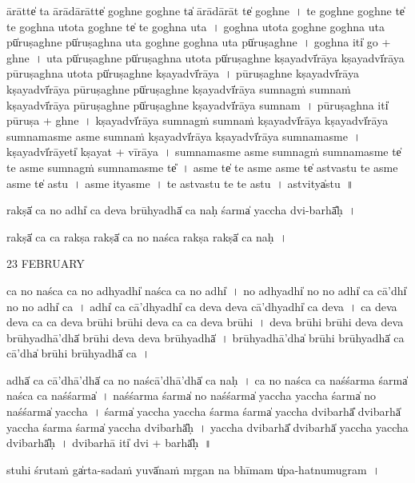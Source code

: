 \documentclass[parskip, DIV=14]{scrartcl}
\begin{document}
{ā॒rātte̍ ta ā॒rādā॒rātte̍ go॒ghne go॒ghne ta̍ ā॒rādā॒rāt te̍ go॒ghne~। %
te॒ go॒ghne go॒ghne te̍ te go॒ghna u॒tota go॒ghne te̍ te go॒ghna u॒ta~।
go॒ghna u॒tota go॒ghne go॒ghna u॒ta pū̍ruṣa॒ghne pū̍ruṣa॒ghna u॒ta go॒ghne go॒ghna u॒ta pū̍ruṣa॒ghne~।
go॒ghna iti̍ go + ghne~।
u॒ta pū̍ruṣa॒ghne pū̍ruṣa॒ghna u॒tota pū̍ruṣa॒ghne kṣa॒yadvī̍rāya kṣa॒yadvī̍rāya pūruṣa॒ghna u॒tota pū̍ruṣa॒ghne kṣa॒yadvī̍rāya~।
pū॒ru॒ṣa॒ghne kṣa॒yadvī̍rāya kṣa॒yadvī̍rāya pūruṣa॒ghne pū̍ruṣa॒ghne kṣa॒yadvī̍rāya su॒mnagṁ su॒mnaṁ kṣa॒yadvī̍rāya pūruṣa॒ghne pū̍ruṣa॒ghne kṣa॒yadvī̍rāya su॒mnam~।
pū॒ru॒ṣa॒ghna iti̍ pūruṣa + ghne~।
kṣa॒yadvī̍rāya su॒mnagṁ su॒mnaṁ kṣa॒yadvī̍rāya kṣa॒yadvī̍rāya su॒mnama॒sme a॒sme su॒mnaṁ kṣa॒yadvī̍rāya kṣa॒yadvī̍rāya su॒mnama॒sme~।
kṣa॒yadvī̍rā॒yeti̍ kṣa॒yat + vī॒rā॒ya॒~।
su॒mnama॒sme a॒sme su॒mnagṁ su॒mnama॒sme te̍ te a॒sme su॒mnagṁ su॒mnama॒sme te̎~।
a॒sme te̍ te a॒sme a॒sme te̍ astvastu te a॒sme a॒sme te̍ astu~।
a॒sme itya॒sme~। %
te॒ a॒stva॒stu॒ te॒ te॒ a॒stu॒~।
a॒stvitya̍stu~॥ 

rakṣā̍ ca no॒ adhi̍ ca deva brū॒hyadhā̍ ca na॒ḥ śarma̍ yaccha dvi॒-barhā̎ḥ~।

rakṣā̍ ca ca॒ rakṣa॒ rakṣā̍ ca no naśca॒ rakṣa॒ rakṣā̍ ca naḥ~।

23 FEBRUARY

ca॒ no॒ na॒śca॒ ca॒ no॒ adhyadhi̍ naśca ca no॒ adhi̍~। %
no॒ adhyadhi̍ no no॒ adhi̍ ca॒ cā'dhi̍ no no॒ adhi̍ ca~। %
adhi̍ ca॒ cā'dhyadhi̍ ca deva deva॒ cā'dhyadhi̍ ca deva~। %
ca॒ de॒va॒ de॒va॒ ca॒ ca॒ de॒va॒ brū॒hi॒ brū॒hi॒ de॒va॒ ca॒ ca॒ de॒va॒ brū॒hi॒~।
de॒va॒ brū॒hi॒ brū॒hi॒ de॒va॒ de॒va॒ brū॒hyadhā'dhā̍ brūhi deva deva brū॒hyadhā̍~।
brū॒hyadhā'dha̍ brūhi brū॒hyadhā̍ ca॒ cā'dha̍ brūhi brū॒hyadhā̍ ca~। %

adhā̍ ca॒ cā'dhā'dhā̍ ca no na॒ścā'dhā'dhā̍ ca naḥ~।  %
ca॒ no॒ na॒śca॒ ca॒ na॒śśarma॒ śarma̍ naśca ca na॒śśarma̍~।
na॒śśarma॒ śarma̍ no na॒śśarma̍ yaccha yaccha॒ śarma̍ no na॒śśarma̍ yaccha~।
śarma̍ yaccha yaccha॒ śarma॒ śarma̍ yaccha dvi॒barhā̎ dvi॒barhā̍ yaccha॒ śarma॒ śarma̍ yaccha dvi॒barhā̎ḥ~। 
ya॒ccha॒ dvi॒barhā̎ dvi॒barhā̍ yaccha yaccha dvi॒barhā̎ḥ~। %
dvi॒barhā॒ iti̍ dvi + barhā̎ḥ~॥  %


stu॒hi śru॒taṁ ga̍rta॒-sadaṁ yuvā̍naṁ mṛ॒gan na bhī॒mam u̍pa-ha॒tnumu॒gram~।

}
\end{document}
